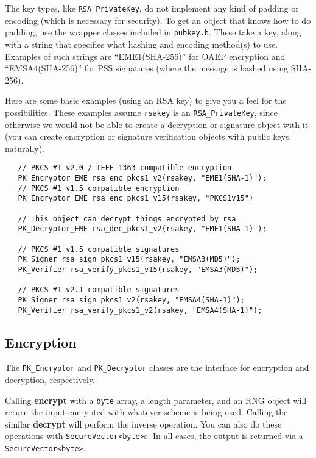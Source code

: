 \documentclass{article}
\newcommand{\filename}[1]{\texttt{#1}}
\newcommand{\function}[1]{\textbf{#1}}
\newcommand{\type}[1]{\texttt{#1}}
\begin{document}
The key types, like \type{RSA\_PrivateKey}, do not implement any kind
of padding or encoding (which is necessary for security). To get an
object that knows how to do padding, use the wrapper classes included
in \filename{pubkey.h}. These take a key, along with a string that
specifies what hashing and encoding method(s) to use. Examples of such
strings are ``EME1(SHA-256)'' for OAEP encryption and
``EMSA4(SHA-256)'' for PSS signatures (where the message is hashed
using SHA-256).

Here are some basic examples (using an RSA key) to give you a feel for
the possibilities. These examples assume \type{rsakey} is an
\type{RSA\_PrivateKey}, since otherwise we would not be able to create
a decryption or signature object with it (you can create encryption or
signature verification objects with public keys, naturally).

\begin{verbatim}
   // PKCS #1 v2.0 / IEEE 1363 compatible encryption
   PK_Encryptor_EME rsa_enc_pkcs1_v2(rsakey, "EME1(SHA-1)");
   // PKCS #1 v1.5 compatible encryption
   PK_Encryptor_EME rsa_enc_pkcs1_v15(rsakey, "PKCS1v15")

   // This object can decrypt things encrypted by rsa_
   PK_Decryptor_EME rsa_dec_pkcs1_v2(rsakey, "EME1(SHA-1)");

   // PKCS #1 v1.5 compatible signatures
   PK_Signer rsa_sign_pkcs1_v15(rsakey, "EMSA3(MD5)");
   PK_Verifier rsa_verify_pkcs1_v15(rsakey, "EMSA3(MD5)");

   // PKCS #1 v2.1 compatible signatures
   PK_Signer rsa_sign_pkcs1_v2(rsakey, "EMSA4(SHA-1)");
   PK_Verifier rsa_verify_pkcs1_v2(rsakey, "EMSA4(SHA-1)");
\end{verbatim}

\subsection{Encryption}

The \type{PK\_Encryptor} and \type{PK\_Decryptor} classes are the
interface for encryption and decryption, respectively.

Calling \function{encrypt} with a \type{byte} array, a length
parameter, and an RNG object will return the input encrypted with
whatever scheme is being used. Calling the similar \function{decrypt}
will perform the inverse operation. You can also do these operations
with \type{SecureVector<byte>}s. In all cases, the output is returned
via a \type{SecureVector<byte>}.
\end{document}
